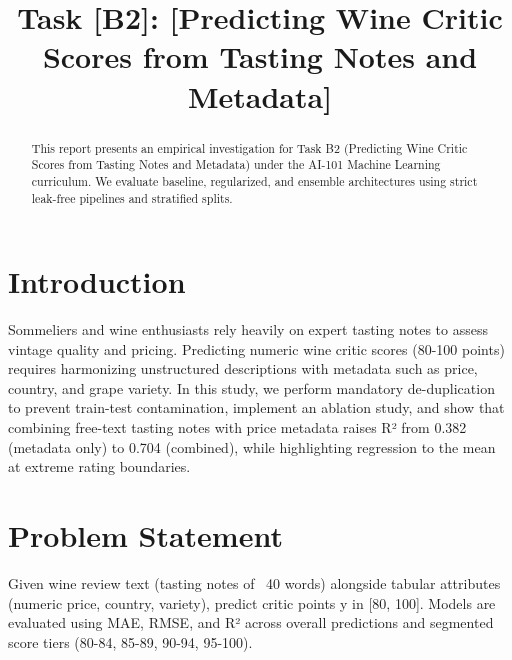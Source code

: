 \documentclass[conference]{IEEEtran}
\begin{document}
\title{Task [B2]: [Predicting Wine Critic Scores from Tasting Notes and Metadata]}

\author{
}

\maketitle

\begin{abstract}
This report presents an empirical investigation for Task B2 (Predicting Wine Critic Scores from Tasting Notes and Metadata) under the AI-101 Machine Learning curriculum. We evaluate baseline, regularized, and ensemble architectures using strict leak-free pipelines and stratified splits.
\end{abstract}

\section{Introduction}
Sommeliers and wine enthusiasts rely heavily on expert tasting notes to assess vintage quality and pricing. Predicting numeric wine critic scores (80-100 points) requires harmonizing unstructured descriptions with metadata such as price, country, and grape variety. In this study, we perform mandatory de-duplication to prevent train-test contamination, implement an ablation study, and show that combining free-text tasting notes with price metadata raises R² from 0.382 (metadata only) to 0.704 (combined), while highlighting regression to the mean at extreme rating boundaries.

\section{Problem Statement}
Given wine review text (tasting notes of ~40 words) alongside tabular attributes (numeric price, country, variety), predict critic points y in [80, 100]. Models are evaluated using MAE, RMSE, and R² across overall predictions and segmented score tiers (80-84, 85-89, 90-94, 95-100).
\end{document}
